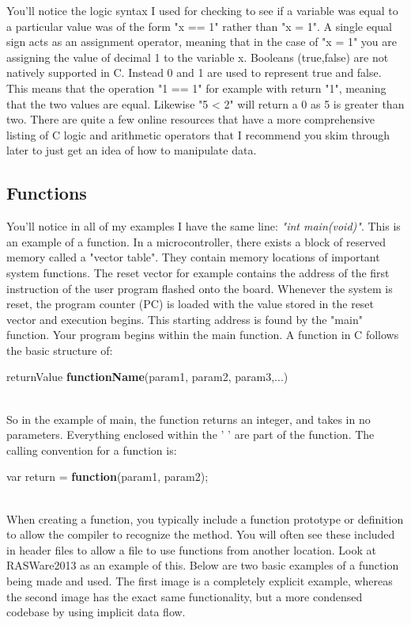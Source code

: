 \documentclass[paper=a4, fontsize=11pt]{scrartcl}
\numberwithin{equation}{section}		%
\numberwithin{figure}{section}			%
\numberwithin{table}{section}			%
\begin{document}
You'll notice the logic syntax I used for checking to see if a variable was equal to a particular value was of the form "x == 1" rather than "x = 1". A single equal sign acts as an assignment operator, meaning that in the case of "x = 1" you are assigning the value of decimal 1 to the variable x. Booleans (true,false) are not natively supported in C. Instead 0 and 1 are used to represent true and false. This means that the operation "1 == 1" for example with return "1", meaning that the two values are equal. Likewise "5 < 2" will return a 0 as 5 is greater than two. There are quite a few online resources that have a more comprehensive listing of C logic and arithmetic operators that I recommend you skim through later to just get an idea of how to manipulate data.

\subsection{Functions}
You'll notice in all of my examples I have the same line: \textit{"int main(void)"}. This is an example of a function. In a microcontroller, there exists a block of reserved memory called a "vector table". They contain memory locations of important system functions. The reset vector for example contains the address of the first instruction of the user program flashed onto the board. Whenever the system is reset, the program counter (PC) is loaded with the value stored in the reset vector and execution begins. This starting address is found by the "main" function. Your program begins within the main function. A function in C follows the basic structure of: \\
\centerline{returnValue \textbf{functionName}(param1, param2, param3,...)}\\
So in the example of main, the function returns an integer, and takes in no parameters. Everything enclosed within the '{ }' are part of the function. The calling convention for a function is:\\
\centerline{var return = \textbf{function}(param1, param2);}\\
When creating a function, you typically include a function prototype or definition to allow the compiler to recognize the method. You will often see these included in header files to allow a file to use functions from another location. Look at RASWare2013 as an example of this. Below are two basic examples of a function being made and used. The first image is a completely explicit example, whereas the second image has the exact same functionality, but a more condensed codebase by using implicit data flow.
\end{document}
